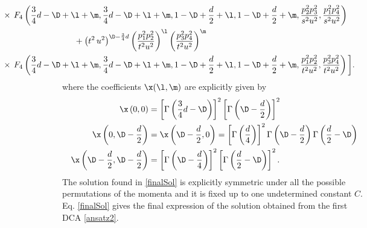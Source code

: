 \documentclass[a4paper,11pt,openright,twoside]{book}
\numberwithin{equation}{section}
\begin{document}
{\begin{align}
	&\hspace{-3cm}\times\,F_4\left(\frac{3}{4}d-\D+\l+\m,\frac{3}{4}d-\D+\l+\m,1-\D+\frac{d}{2}+\l,1-\D+\frac{d}{2}+\m,\frac{p_2^2 p_3^2}{s^2 u^2},\frac{p_1^2 p_4^2}{s^2 u^2}\right)\notag\\
	&+\big(t^2\,u^2\big)^{\D-\frac{3}{4}d}\left(\frac{p_1^2 p_2^2}{t^2 u^2}\right)^\l\left(\frac{p_3^2p_4^2}{t^2u^2}\right)^\m\notag\\
	&\hspace{-3cm}\times\,F_4\left(\frac{3}{4}d-\D+\l+\m,\frac{3}{4}d-\D+\l+\m,1-\D+\frac{d}{2}+\l,1-\D+\frac{d}{2}+\m,\frac{p_1^2 p_2^2}{t^2 u^2},\frac{p_3^2 p_4^2}{t^2 u^2}\right)\bigg].\label{finalSol}
\end{align}
where the coefficients $\x(\l,\m)$ are explicitly given by
\begin{equation}
	\begin{split}
		\x\left(0,0\right)&=\left[\Gamma\left(\frac{3}{4}d-\D\right)\right]^2\left[\Gamma\left(\D-\frac{d}{2}\right)\right]^2\\
		\x\left(0,\D-\frac{d}{2}\right)&=\x\left(\D-\frac{d}{2},0\right)=\left[\Gamma\left(\frac{d}{4}\right)\right]^2\Gamma\left(\D-\frac{d}{2}\right)\Gamma\left(\frac{d}{2}-\D\right)\\
		\x\left(\D-\frac{d}{2},\D-\frac{d}{2}\right)&=\left[\Gamma\left(\D-\frac{d}{4}\right)\right]^2\left[\Gamma\left(\frac{d}{2}-\D\right)\right]^2.
	\end{split}\label{xicoef}
\end{equation}
The solution found in \eqref{finalSol} is explicitly symmetric under all the possible permutations of the momenta and it is fixed up to one undetermined constant $C$. Eq. \eqref{finalSol} gives the final expression of the solution obtained from the first DCA \eqref{ansatz2}.

}
\end{document}
